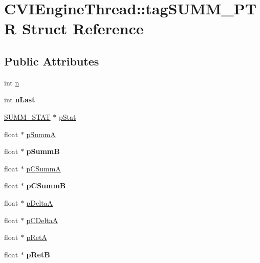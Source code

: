 \hypertarget{struct_c_v_i_engine_thread_1_1tag_s_u_m_m___p_t_r}{\section{C\+V\+I\+Engine\+Thread\+:\+:tag\+S\+U\+M\+M\+\_\+\+P\+T\+R Struct Reference}
\label{struct_c_v_i_engine_thread_1_1tag_s_u_m_m___p_t_r}
}
\subsection*{Public Attributes}
\begin{DoxyCompactItemize}
\item 
int \hyperlink{struct_c_v_i_engine_thread_1_1tag_s_u_m_m___p_t_r_ac647af24f7a8fd2e62d4bdc12f4b7465}{n}
\item 
\hypertarget{struct_c_v_i_engine_thread_1_1tag_s_u_m_m___p_t_r_a8091fef3aa3c1fc0f290a6a37c8183f0}{int {\bfseries n\+Last}}\label{struct_c_v_i_engine_thread_1_1tag_s_u_m_m___p_t_r_a8091fef3aa3c1fc0f290a6a37c8183f0}

\item 
\hyperlink{class_s_u_m_m___s_t_a_t}{S\+U\+M\+M\+\_\+\+S\+T\+A\+T} $\ast$ \hyperlink{struct_c_v_i_engine_thread_1_1tag_s_u_m_m___p_t_r_a6191d3122464142f39ce9f4915bab62d}{p\+Stat}
\item 
float $\ast$ \hyperlink{struct_c_v_i_engine_thread_1_1tag_s_u_m_m___p_t_r_a126884c9b05358fd2bbcf2dbde7c242a}{p\+Summ\+A}
\item 
\hypertarget{struct_c_v_i_engine_thread_1_1tag_s_u_m_m___p_t_r_a3ab7ca61e3ade712b4237db5895d8a88}{float $\ast$ {\bfseries p\+Summ\+B}}\label{struct_c_v_i_engine_thread_1_1tag_s_u_m_m___p_t_r_a3ab7ca61e3ade712b4237db5895d8a88}

\item 
float $\ast$ \hyperlink{struct_c_v_i_engine_thread_1_1tag_s_u_m_m___p_t_r_a871f6a62c19fe2662b61acef3c5e1f0b}{p\+C\+Summ\+A}
\item 
\hypertarget{struct_c_v_i_engine_thread_1_1tag_s_u_m_m___p_t_r_a0effd46c6b09adb82a777412cd46498b}{float $\ast$ {\bfseries p\+C\+Summ\+B}}\label{struct_c_v_i_engine_thread_1_1tag_s_u_m_m___p_t_r_a0effd46c6b09adb82a777412cd46498b}

\item 
float $\ast$ \hyperlink{struct_c_v_i_engine_thread_1_1tag_s_u_m_m___p_t_r_a444d782116994b861413c34b87443b3e}{p\+Delta\+A}
\item 
float $\ast$ \hyperlink{struct_c_v_i_engine_thread_1_1tag_s_u_m_m___p_t_r_ad82e974c7623d903cf3e9f183142e505}{p\+C\+Delta\+A}
\item 
float $\ast$ \hyperlink{struct_c_v_i_engine_thread_1_1tag_s_u_m_m___p_t_r_a3bc8858e41a32ab6c03033d80a2b6fa6}{p\+Ret\+A}
\item 
\hypertarget{struct_c_v_i_engine_thread_1_1tag_s_u_m_m___p_t_r_afe1f130a05053561497de389d60b1d39}{float $\ast$ {\bfseries p\+Ret\+B}}\label{struct_c_v_i_engine_thread_1_1tag_s_u_m_m___p_t_r_afe1f130a05053561497de389d60b1d39}


\end{DoxyCompactItemize}
